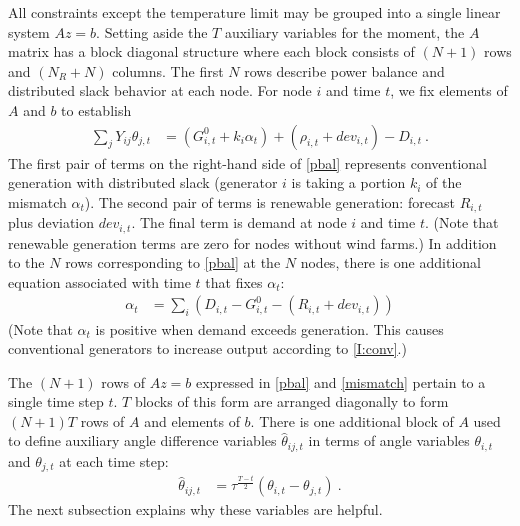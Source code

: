 \documentclass[conference]{IEEEtran}
\begin{document}
All constraints except the temperature limit may be grouped into a single linear system $Az=b$. Setting aside the $T$ auxiliary variables for the moment, the $A$ matrix has a block diagonal structure where each block consists of $(N+1)$ rows and $(N_R+N)$ columns. The first $N$ rows describe power balance and distributed slack behavior at each node. For node $i$ and time $t$, we fix elements of $A$ and $b$ to establish
\begin{align}\label{pbal}
\sum\limits_{j} Y_{ij}\theta_{j,t}  &= (G_{i,t}^0 + k_i\alpha_t) + (\rho_{i,t} + dev_{i,t}) - D_{i,t}~.
\end{align}
The first pair of terms on the right-hand side of \eqref{pbal} represents conventional generation with distributed slack (generator $i$ is taking a portion $k_i$ of the mismatch $\alpha_t$). The second pair of terms is renewable generation: forecast $R_{i,t}$ plus deviation $dev_{i,t}$. The final term is demand at node $i$ and time $t$. (Note that renewable generation terms are zero for nodes without wind farms.) In addition to the $N$ rows corresponding to \eqref{pbal} at the $N$ nodes, there is one additional equation associated with time $t$ that fixes $\alpha_t$:
\begin{align}\label{mismatch}
 \alpha_t &= \sum_i \left(D_{i,t} - G_{i,t}^0 - (R_{i,t} + dev_{i,t})\right)
\end{align}
(Note that $\alpha_t$ is positive when demand exceeds generation. This causes conventional generators to increase output according to \eqref{I:conv}.)

The $(N+1)$ rows of $Az=b$ expressed in \eqref{pbal} and \eqref{mismatch} pertain to a single time step $t$. $T$ blocks of this form are arranged diagonally to form $(N+1)T$ rows of $A$ and elements of $b$. There is one additional block of $A$ used to define auxiliary angle difference variables $\hat{\theta}_{ij,t}$ in terms of angle variables $\theta_{i,t}$ and $\theta_{j,t}$ at each time step:
\begin{align}\label{thetahat}
\hat{\theta}_{ij,t} &= \tau^{\frac{T-t}{2}}(\theta_{i,t} - \theta_{j,t})~.
\end{align}
The next subsection explains why these variables are helpful.
\end{document}
